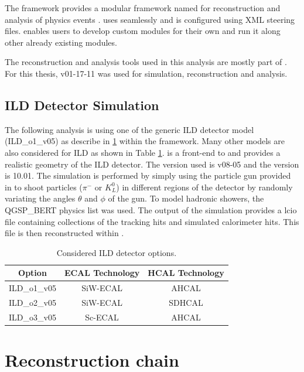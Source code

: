 The \ilcsoft framework provides a modular \cpp framework named \marlin for reconstruction and analysis of physics events \cite{Gaede:2006pj}. \marlin uses \lcio seamlessly and is configured using XML steering files. \marlin enables users to develop custom modules for their own and run it along other already existing modules.

The reconstruction and analysis tools used in this analysis are mostly part of \ilcsoft. For this thesis, \ilcsoft v01-17-11 was used for simulation, reconstruction and analysis.

\subsection{ILD Detector Simulation}

The following analysis is using one of the generic ILD detector model (ILD\_o1\_v05) as describe in \ref{} within the \mokka framework. Many other models are also considered for ILD as shown in Table \ref{ILDOptions}. \mokka is a front-end to \geant and provides a realistic geometry of the ILD detector. The \mokka version used is v08-05 and the \geant version is 10.01.
The simulation is performed by simply using the particle gun provided in \geant to shoot particles ($\pi^{-}$ or $K^{0}_{L}$) in different regions of the detector by randomly variating the angles $\theta$ and $\phi$ of the gun. To model hadronic showers, the QGSP\_BERT physics list was used. The output of the simulation provides a lcio file containing collections of the tracking hits and simulated calorimeter hits. This file is then reconstructed within \marlin.

\begin{table}[t]
  \centering
  \caption{Considered ILD detector options.} \label{ILDOptions}
  \begin{tabular}{|c|c|c|}
    \hline
    Option & ECAL Technology & HCAL Technology \\
    \hline
    ILD\_o1\_v05 & SiW-ECAL & AHCAL \\
    ILD\_o2\_v05 & SiW-ECAL & SDHCAL \\
    ILD\_o3\_v05 & Sc-ECAL & AHCAL \\
    \hline
  \end{tabular}
\end{table}

\section{Reconstruction chain}

